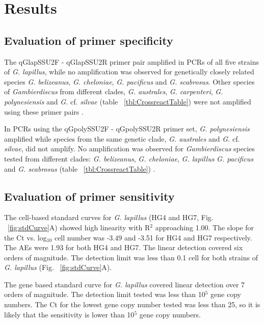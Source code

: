 \documentclass[12pt]{article}
\begin{document}
\newpage
\section*{Results}
\subsection*{Evaluation of primer specificity}
The qGlapSSU2F - qGlapSSU2R primer pair amplified in PCRs of all five strains of \emph{G. lapillus}, while no amplification was observed for genetically closely related species \emph{G. belizeanus}, \emph{G. cheloniae}, \emph{G. pacificus} and \emph{G. scabrosus}. Other species of \emph{Gambierdiscus} from different clades, \emph{G. australes}, \emph{G. carpenteri}, \emph{G. polynesiensis} and \emph{G.} cf. \emph{silvae} (table ~\ref{tbl:CrossreactTable}) were not amplified using these primer pairs \citep{smith2016new,kretzschmar2016characterization}.

In PCRs using the qGpolySSU2F - qGpolySSU2R primer set, \emph{G. polynesiensis} amplified while species from the same genetic clade, \emph{G. australes} and \emph{G.} cf. \emph{silvae}, did not amplify. No amplification was observed for \emph{Gambierdiscus} species tested from different clades: \emph{G. belizeanus}, \emph{G. cheloniae}, \emph{G. lapillus }\emph{G. pacificus} and \emph{G. scabrosus} (table ~\ref{tbl:CrossreactTable}) \citep{kretzschmar2016characterization}.


 
\subsection*{Evaluation of primer sensitivity}
The cell-based standard curves for \emph{G. lapillus} (HG4 and HG7, Fig. ~\ref{fig:stdCurve}A) showed high linearity with R$^{2}$ approaching 1.00. The slope for the Ct vs. log$_{10}$ cell number was -3.49 and -3.51 for HG4 and HG7 respectively. The AEs were 1.93 for both HG4 and HG7. The linear detection covered six orders of magnitude. The detection limit was less than 0.1 cell for both strains of \emph{G. lapillus} (Fig. ~\ref{fig:stdCurve}A).



The gene based standard curve for \emph{G. lapillus} covered linear detection over 7 orders of magnitude. The detection limit tested was less than 10$^{5}$ gene copy numbers. The Ct for the lowest gene copy number tested was less than 25, so it is likely that the sensitivity is lower than 10$^{5}$ gene copy numbers.
\end{document}
